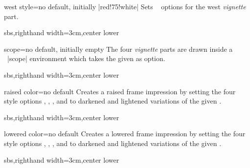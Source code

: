 \begin{vigTcbKey}[][doc new=2016-04-22]{west style}{=}{no default, initially |red!75!white|}
  Sets \tikzname\  options for the west \emph{vignette} part.
\begin{dispExample*}{sbs,righthand width=3cm,center lower}
\end{dispExample*}
\end{vigTcbKey}


\begin{vigTcbKey}[][doc new=2016-05-24]{scope}{=}{no default, initially empty}
  The four \emph{vignette} parts are drawn inside a \tikzname\ |scope|
  environment which takes the given  as option.
\begin{dispExample*}{sbs,righthand width=3cm,center lower}
\end{dispExample*}
\end{vigTcbKey}



\begin{vigTcbKey}[][doc new=2016-04-22]{raised color}{=}{no default}
  Creates a raised frame impression by setting the four style options
  ,
  ,
  , and
  to darkened and lightened variations of the given .
\begin{dispExample*}{sbs,righthand width=3cm,center lower}
\end{dispExample*}
\end{vigTcbKey}


\begin{vigTcbKey}[][doc new=2016-04-22]{lowered color}{=}{no default}
  Creates a lowered frame impression by setting the four style options
  ,
  ,
  , and
  to darkened and lightened variations of the given .
\begin{dispExample*}{sbs,righthand width=3cm,center lower}
\end{dispExample*}
\end{vigTcbKey}


